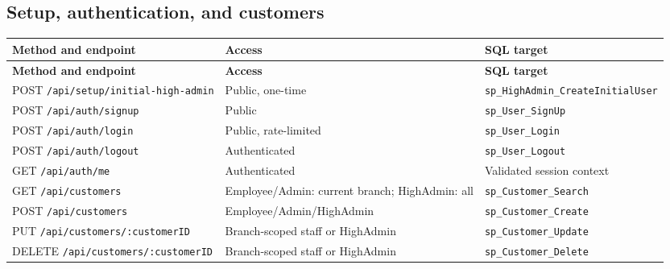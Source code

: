 \documentclass[11pt,a4paper,oneside]{report}
\begin{document}
{\footnotesize
\setlength{\tabcolsep}{4pt}
\renewcommand{\arraystretch}{1.12}

\subsection{Setup, authentication, and customers}
\begin{longtable}{L{0.40\textwidth}L{0.27\textwidth}L{0.24\textwidth}}
\toprule\textbf{Method and endpoint} & \textbf{Access} & \textbf{SQL target}\\\midrule\endfirsthead
\toprule\textbf{Method and endpoint} & \textbf{Access} & \textbf{SQL target}\\\midrule\endhead
POST \nolinkurl{/api/setup/initial-high-admin} & Public, one-time & \nolinkurl{sp_HighAdmin_CreateInitialUser}\\
POST \nolinkurl{/api/auth/signup} & Public & \nolinkurl{sp_User_SignUp}\\
POST \nolinkurl{/api/auth/login} & Public, rate-limited & \nolinkurl{sp_User_Login}\\
POST \nolinkurl{/api/auth/logout} & Authenticated & \nolinkurl{sp_User_Logout}\\
GET \nolinkurl{/api/auth/me} & Authenticated & Validated session context\\
GET \nolinkurl{/api/customers} & Employee/Admin: current branch; HighAdmin: all & \nolinkurl{sp_Customer_Search}\\
POST \nolinkurl{/api/customers} & Employee/Admin/HighAdmin & \nolinkurl{sp_Customer_Create}\\
PUT \nolinkurl{/api/customers/:customerID} & Branch-scoped staff or HighAdmin & \nolinkurl{sp_Customer_Update}\\
DELETE \nolinkurl{/api/customers/:customerID} & Branch-scoped staff or HighAdmin & \nolinkurl{sp_Customer_Delete}\\
\bottomrule
\end{longtable}

}
\end{document}
